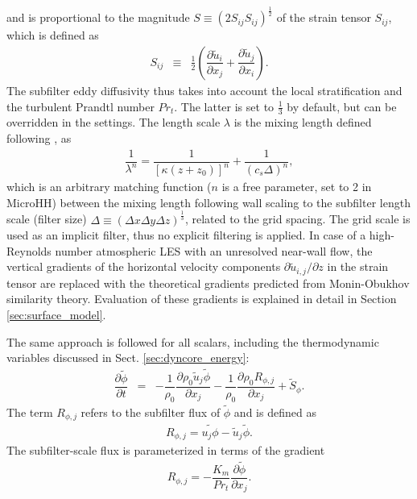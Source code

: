 \documentclass[gmd,manuscript]{copernicus}
\newcommand{\uf}{\ensuremath{\widetilde{u}}}
\newcommand{\phif}{\ensuremath{\widetilde{\phi}}}
\begin{document}
and is proportional to the magnitude $S \equiv \left( 2 S_{ij} S_{ij} \right)^\frac{1}{2}$ of the strain tensor $S_{ij}$, which is defined as
\begin{eqnarray}
S_{ij} & \equiv & \frac{1}{2} \left( \dfrac{\partial \uf_i}{\partial x_j} + \dfrac{\partial \uf_j}{\partial x_i} \right).
\end{eqnarray}
The subfilter eddy diffusivity thus takes into account the local stratification and the turbulent Prandtl number $Pr_t$. The latter is set to $\frac{1}{3}$ by default, but can be overridden in the settings. The length scale  $\lambda$ is the mixing length defined following \citet{Mason1992}, as
\begin{eqnarray}
\dfrac{1}{\lambda^n} = \dfrac{1}{\left[ \kappa \left(z + z_0 \right) \right]^n} + \dfrac{1}{\left( c_s \Delta \right)^n},
\end{eqnarray}
which is an arbitrary matching function ($n$ is a free parameter, set to 2 in MicroHH) between the mixing length following wall scaling to the subfilter length scale (filter size) $\Delta \equiv (\Delta x \Delta y \Delta z)^\frac{1}{3}$, related to the grid spacing. The grid scale is used as an implicit filter, thus no explicit filtering is applied. In case of a high-Reynolds number atmospheric LES with an unresolved near-wall flow, the vertical gradients of the horizontal velocity components $\partial \uf_{i,j}/\partial z$  in the strain tensor are replaced with the theoretical gradients predicted from Monin-Obukhov similarity theory. Evaluation of these gradients is explained in detail in Section \ref{sec:surface_model}.

The same approach is followed for all scalars, including the thermodynamic variables discussed in Sect. \ref{sec:dyncore_energy}:
\begin{eqnarray}
\dfrac{\partial \phif}{\partial t} & = & - \dfrac{1}{\rho_0} \dfrac{\partial \rho_0 \uf_j \phif}{\partial x_j} - \dfrac{1}{\rho_0} \dfrac{\partial \rho_0 R_{\phi,j}}{\partial x_j} + \widetilde{S}_\phi. \label{eq:consscal_filter}
\end{eqnarray}
The term $R_{\phi,j}$ refers to the subfilter flux of $\phif$ and is defined as
\begin{eqnarray}
R_{\phi,j} = \widetilde{u_j \phi} - \uf_j \phif.
\end{eqnarray}
The subfilter-scale flux is parameterized in terms of the gradient
\begin{eqnarray}
R_{\phi,j} = - \dfrac{K_m}{Pr_t} \dfrac{\partial \phif}{\partial x_j}.
\end{eqnarray}
\end{document}
